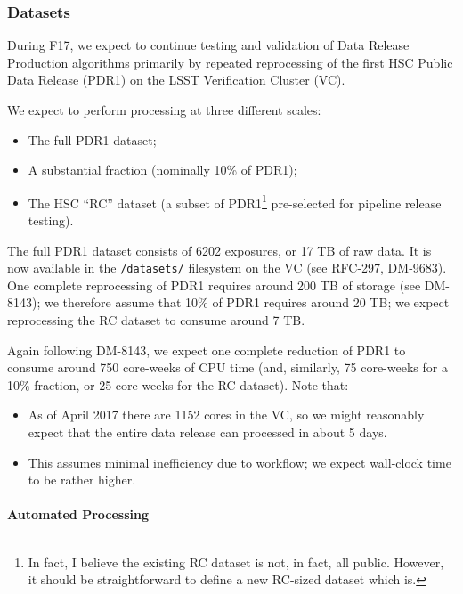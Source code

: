
\subsubsection{Datasets}\label{datasets}

During F17, we expect to continue testing and validation of Data Release
Production algorithms primarily by repeated reprocessing of the first
HSC Public Data Release (PDR1) on the LSST Verification Cluster (VC).

We expect to perform processing at three different scales:

\begin{itemize}
\item
  The full PDR1 dataset;
\item
  A substantial fraction (nominally 10\% of PDR1);
\item
  The HSC ``RC'' dataset (a subset of PDR1\footnote{In fact, I believe
    the existing RC dataset is not, in fact, all public. However, it
    should be straightforward to define a new RC-sized dataset which is.}
  pre-selected for pipeline release testing).
\end{itemize}

The full PDR1 dataset consists of 6202 exposures, or 17 TB of raw data.
It is now available in the \texttt{/datasets/} filesystem on the VC (see
RFC-297, DM-9683). One complete reprocessing of PDR1 requires around 200
TB of storage (see DM-8143); we therefore assume that 10\% of PDR1
requires around 20 TB; we expect reprocessing the RC dataset to consume
around 7 TB.

Again following DM-8143, we expect one complete reduction of PDR1 to
consume around 750 core-weeks of CPU time (and, similarly, 75 core-weeks
for a 10\% fraction, or 25 core-weeks for the RC dataset). Note that:

\begin{itemize}
\item
  As of April 2017 there are 1152 cores in the VC, so we might
  reasonably expect that the entire data release can processed in about
  5 days.
\item
  This assumes minimal inefficiency due to workflow; we expect
  wall-clock time to be rather higher.
\end{itemize}

\paragraph{Automated Processing}\label{automated-processing}


